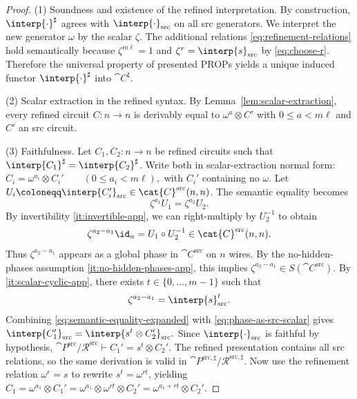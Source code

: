 \documentclass[10pt,a4paper]{article}
\def\cref#1{Lemma~\ref{#1}}%
\begin{document}
\begin{proof}
(1) Soundness and existence of the refined interpretation.
By construction, $\interp{\cdot}^{\sharp}$ agrees with $\interp{\cdot}_{\mathrm{src}}$ on all src generators.
We interpret the new generator $\omega$ by the scalar $\zeta$.
The additional relations \eqref{eq:refinement-relations} hold semantically because
$\zeta^{m\ell}=1$ and $\zeta^{r}=\interp{s}_{\mathrm{src}}$ by \eqref{eq:choose-r}.
Therefore the universal property of presented PROPs yields a unique induced functor
$\interp{\cdot}^{\sharp}$ into $ \cat{C}^{\sharp}$.

(2) Scalar extraction in the refined syntax.
By \cref{lem:scalar-extraction}, every refined circuit $C:n\to n$ is derivably equal to
$\omega^{a}\otimes C'$ with $0\le a<m\ell$ and $C'$ an src circuit.

(3) Faithfulness.
Let $C_1,C_2:n\to n$ be refined circuits such that
$\interp{C_1}^{\sharp}=\interp{C_2}^{\sharp}$.
Write both in scalar-extraction normal form:
\(
  C_i = \omega^{a_i}\otimes C_i'
  \qquad (0\le a_i<m\ell),
\)
with $C_i'$ containing no $\omega$.
Let $U_i\coloneqq \interp{C_i'}_{\mathrm{src}}\in \cat{C}^{\mathrm{src}}(n,n)$.
The semantic equality becomes
\begin{equation}\label{eq:semantic-equality-expanded}
  \zeta^{a_1}   U_1 = \zeta^{a_2}  U_2.
\end{equation}
By invertibility \ref{it:invertible-app}, we can right-multiply by $U_2^{-1}$ to obtain
\begin{equation}\label{eq:phase-in-src-app}
  \zeta^{a_2-a_1} \id_n = U_1\circ U_2^{-1}
  \in  \cat{C}^{\mathrm{src}}(n,n).
\end{equation}
Thus $\zeta^{a_2-a_1}$ appears as a global phase in $ \cat{C}^{\mathrm{src}}$ on $n$ wires.
By the no-hidden-phases assumption \ref{it:no-hidden-phases-app}, this implies
\(
  \zeta^{a_2-a_1}\in S( \cat{C}^{\mathrm{src}}).
\)
By \ref{it:scalar-cyclic-app}, there exists $t\in\{0,\dots,m-1\}$ such that
\begin{equation}\label{eq:phase-as-src-scalar}
  \zeta^{a_2-a_1} = \interp{s}_{\mathrm{src}}^{ t}.
\end{equation}
Combining \eqref{eq:semantic-equality-expanded} with \eqref{eq:phase-as-src-scalar} gives
\(
  \interp{C_1'}_{\mathrm{src}}
  =
  \interp{s^{t}\otimes C_2'}_{\mathrm{src}}.
\)
Since $\interp{\cdot}_{\mathrm{src}}$ is faithful by hypothesis,
\(
  \cat{P}^{\mathrm{src}}/\mathcal{R}^{\mathrm{src}}
  \vdash
  C_1' = s^{t}\otimes C_2'.
\)
The refined presentation contains all src relations, so the same derivation is valid in
$\cat{P}^{\mathrm{src},\sharp}/\mathcal{R}^{\mathrm{src},\sharp}$.
Now use the refinement relation $\omega^{r}=s$ to rewrite $s^{t}=\omega^{rt}$, yielding
\(
  C_1
  =
  \omega^{a_1}\otimes C_1'
  =
  \omega^{a_1}\otimes \omega^{rt}\otimes C_2'
  =
  \omega^{a_1+rt}\otimes C_2'.
\)


\end{proof}
\end{document}
